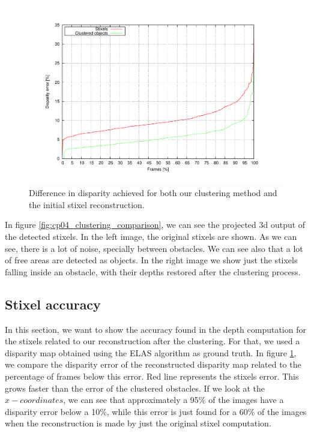 \begin{figure}[h!t!!!!]
\centering
\includegraphics[width=\textwidth,height=0.5\textwidth,trim=50 40 80 60,clip]{disparity}
\caption{Difference in disparity achieved for both our clustering method and the initial stixel reconstruction.}\label{fig:cp04_disparity_comparison}
\end{figure}

In figure \ref{fig:cp04_clustering_comparison}, we can see the projected 3d output of the detected stixels. In the left image, the original stixels are shown. As we can see, there is a lot of noise, specially between obstacles. We can see also that a lot of free areas are detected as objects. In the right image we show just the stixels falling inside an obstacle, with their depths restored after the clustering process.

\subsection{Stixel accuracy}\label{ch:chapter04_02_02}

In this section, we want to show the accuracy found in the depth computation for the stixels related to our reconstruction after the clustering. For that, we used a disparity map obtained using the \ac{ELAS} algorithm as ground truth. In figure \ref{fig:cp04_disparity_comparison}, we compare the disparity error of the reconstructed disparity map related to the percentage of frames below this error. Red line represents the stixels error. This grows faster than the error of the clustered obstacles. If we look at the $x-coordinates$, we can see that approximately a 95\% of the images have a disparity error below a 10\%, while this error is just found for a 60\% of the images when the reconstruction is made by just the original stixel computation.

